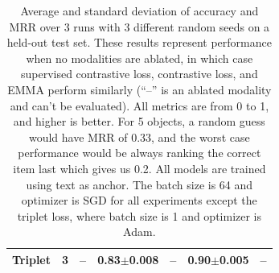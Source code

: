 \documentclass[sigconf,natbib=true,anonymous=true]{acmart}
\begin{document}
\begin{table}[]
\begin{tabular}{lc|ll|lll}
\multicolumn{1}{l|}{Triplet} & 3 & \multicolumn{1}{l|}{--} & 0.83$\pm$0.008 & \multicolumn{1}{l|}{--} & \multicolumn{1}{l|}{0.90$\pm$0.005} & -- \\ \hline
\end{tabular}
\caption{Average and standard deviation of accuracy and MRR over 3 runs with 3 different random seeds on a held-out test set. These results represent performance when no modalities are ablated, in which case supervised contrastive loss, contrastive loss, and EMMA perform similarly (``--'' is an ablated modality and can't be evaluated). All metrics are from 0 to 1, and higher is better. For 5 objects, a random guess would have MRR of 0.33, and the worst case performance would be always ranking the correct item last which gives us 0.2. All models are trained using text as anchor. The batch size is 64 and optimizer is SGD for all experiments except the triplet loss, where batch size is 1 and optimizer is Adam.}
\label{table:quantitative}
\end{table}
\end{document}
